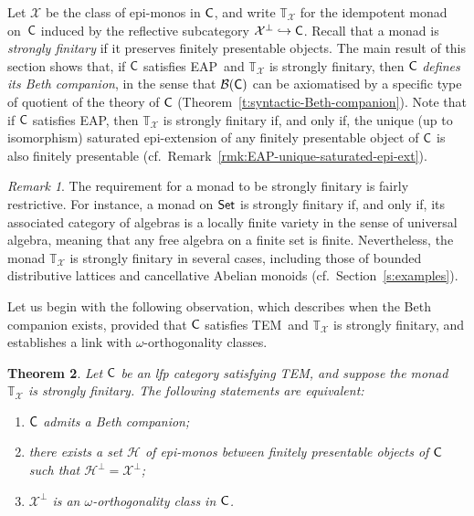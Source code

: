 \documentclass[a4paper,10pt,reqno]{amsart}
\newtheorem{theorem}{Theorem}[section]
\theoremstyle{definition}
\theoremstyle{remark}
\newtheorem{remark}[theorem]{Remark}
\newcommand{\cat}{{\sf C}}								%
\newcommand{\Set}{{\sf Set}}								%
\newcommand{\B}[1]{\mathcal{B}(#1)}						%
\newcommand{\ar}[1]{\mathcal{#1}}							%
\newcommand{\X}{\ar{X}}									%
\newcommand{\into}{\hookrightarrow}						%
\newcommand{\ort}[1]{{#1}^{\perp}}						%
\newcommand{\EAP}{\textnormal{EAP}}
\newcommand{\TEM}{\textnormal{TEM}}
\begin{document}
Let $\X$ be the class of epi-monos in $\cat$, and write $\mathbb{T}_{\X}$ for the idempotent monad on~$\cat$ induced by the reflective subcategory $\ort{\X}\into \cat$. Recall that a monad is \emph{strongly finitary} if it preserves finitely presentable objects. The main result of this section shows that, if $\cat$ satisfies \EAP~and $\mathbb{T}_{\X}$ is strongly finitary, then $\cat$ \emph{defines its Beth companion}, in the sense that $\B{\cat}$ can be axiomatised by a specific type of quotient of the theory of $\cat$ (Theorem~\ref{t:syntactic-Beth-companion}). 
%
Note that if $\cat$ satisfies \EAP, then $\mathbb{T}_{\X}$ is strongly finitary if, and only if, the unique (up to isomorphism) saturated epi-extension of any finitely presentable object of $\cat$ is also finitely presentable (cf.\ Remark~\ref{rmk:EAP-unique-saturated-epi-ext}).

\begin{remark}
The requirement for a monad to be strongly finitary is fairly restrictive. For instance, a monad on $\Set$ is strongly finitary if, and only if, its associated category of algebras is a locally finite variety in the sense of universal algebra, meaning that any free algebra on a finite set is finite. 
%
Nevertheless, the monad $\mathbb{T}_\mathcal{X}$ is strongly finitary in several cases, including those of bounded distributive lattices and cancellative Abelian monoids (cf.\ Section~\ref{s:examples}).
\end{remark}

Let us begin with the following observation, which describes when the Beth companion exists, provided that $\cat$ satisfies \TEM~and $\mathbb{T}_\mathcal{X}$ is strongly finitary, and establishes a link with $\omega$-orthogonality classes.

\begin{theorem} \label{thm:orthinverter}
Let $\cat$ be an lfp category satisfying \TEM, and suppose the monad~$\mathbb{T}_{\X}$ is strongly finitary. 
The following statements are equivalent:
\begin{enumerate}[label=(\arabic*)]
\item\label{i:TEM-strongly-fin-has-BC} $\cat$ admits a Beth companion;
\item\label{i:TEM-set-of-fp-epimonos} there exists a set $\ar{H}$ of epi-monos between finitely presentable objects of $\cat$ such that $\ort{\ar{H}}=\ort{\X}$;
\item\label{i:AP-Sat-ort-class} $\ort{\X}$ is an $\omega$-orthogonality class in $\cat$. 
\end{enumerate}
\end{theorem}
\end{document}
